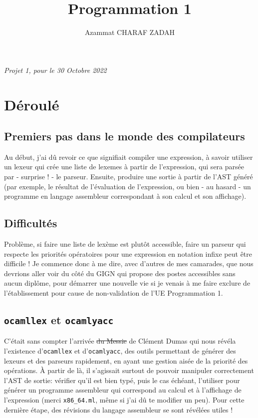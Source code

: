 \documentclass[12pt,french]{article}
\title{Programmation 1}
\author{Azammat CHARAF ZADAH}
\date{}
\date{}
\begin{document}
\maketitle
\begin{center}
    \textit{Projet 1, pour le 30 Octobre 2022}
\end{center}

\section{Déroulé}
\subsection{Premiers pas dans le monde des compilateurs}
Au début, j'ai dû revoir ce que signifiait compiler une expression, à savoir utiliser un lexeur qui crée une liste de lexemes à partir de l'expression, qui sera parsée par - surprise ! - le parseur. Ensuite, produire une sortie à partir de l'AST généré (par exemple, le résultat de l'évaluation de l'expression, ou bien - au hasard - un programme en langage assembleur correspondant à son calcul et son affichage).
\subsection{Difficultés}
Problème, si faire une liste de lexème est plutôt accessible, faire un parseur qui respecte les priorités opératoires pour une expression en notation infixe peut être difficile ! Je commence donc à me dire, avec d'autres de mes camarades, que nous devrions aller voir du côté du GIGN qui propose des postes accessibles sans aucun diplôme, pour démarrer une nouvelle vie si je venais à me faire exclure de l'établissement pour cause de non-validation de l'UE Programmation 1.
\subsection{\texttt{ocamllex} et \texttt{ocamlyacc}}
C'était sans compter l'arrivée \sout{du Messie} de Clément Dumas qui nous révéla l'existence d'\texttt{ocamllex} et d'\texttt{ocamlyacc}, des outils permettant de générer des lexeurs et des parseurs rapidement, en ayant une gestion aisée de la priorité des opérations. À partir de là, il s'agissait surtout de pouvoir manipuler correctement l'AST de sortie: vérifier qu'il est bien typé, puis le cas échéant, l'utiliser pour générer un programme assembleur qui correspond au calcul et à l'affichage de l'expression (merci \texttt{x86\_64.ml}, même si j'ai dû te modifier un peu). Pour cette dernière étape, des révisions du langage assembleur se sont révélées utiles !
\newpage
\end{document}
